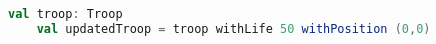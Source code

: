 \begin{lstlisting}[language=Scala, label=code:troop-update, caption= Aggiornamento di una troop.]
    val troop: Troop
    val updatedTroop = troop withLife 50 withPosition (0,0)
\end{lstlisting}